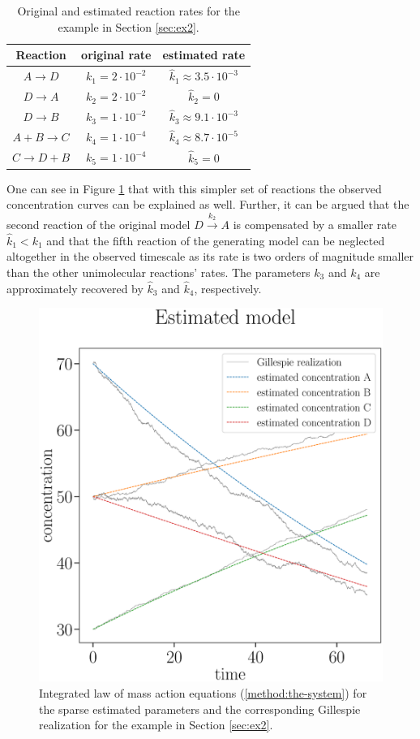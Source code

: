 \documentclass[oneside, abstracton, titlepage]{scrartcl}
\begin{document}
	\begin{table}
		\centering
		\begin{tabular}{ccc}
			Reaction & original rate & estimated rate \\ \hline\noalign{\vskip .1cm}
			$A \to D$ & $k_1 = 2\cdot 10^{-2}$ & $\hat{k}_1 \approx 3.5\cdot 10^{-3}$\\
			$D \to A$ & $k_2 = 2\cdot 10^{-2}$ & $\hat{k}_2 = 0$ \\
			$D\to B$ & $k_3 = 1\cdot 10^{-2}$ & $\hat{k}_3\approx 9.1 \cdot 10^{-3}$ \\
			$A+B\to C$ & $k_4 = 1\cdot 10^{-4}$ & $\hat{k}_4\approx 8.7 \cdot 10^{-5}$ \\
			$C \to D+B$ & $k_5 = 1\cdot 10^{-4}$ & $\hat{k}_5 = 0$
		\end{tabular}
		\caption{Original and estimated reaction rates for the example in Section \ref{sec:ex2}.}
		\label{tab:estimated-rates}
	\end{table}

	One can see in Figure \ref{ex2:result} that with this simpler set of reactions the observed concentration curves can be explained as well. Further, it can be argued that the second reaction of the original model $D\xrightarrow{k_2}A$ is compensated by a smaller rate $\hat{k}_1 < k_1$ and that the fifth reaction of the generating model can be neglected altogether in the observed timescale as its rate is two orders of magnitude smaller than the other unimolecular reactions' rates.
	The parameters $k_3$ and $k_4$ are approximately recovered by $\hat{k}_3$ and $\hat{k}_4$, respectively.

	\begin{figure}
		\begin{center}
			\includegraphics[width=.5\textwidth]{./figures_tex/cv_expected_estimated_concentrations}
		\end{center}
		\caption{Integrated law of mass action equations (\ref{method:the-system}) for the sparse estimated parameters and the corresponding Gillespie realization for the example in Section \ref{sec:ex2}.}
		\label{ex2:result}
	\end{figure}
\end{document}

